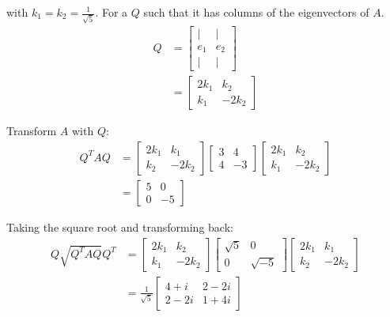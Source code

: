 \documentclass[11pt]{homework}
\begin{document}
with $k_1 = k_2 = \frac{1}{\sqrt{5}}$.
For a $Q$ such that it has columns 
of the eigenvectors of $A$.
\begin{align*}
Q &=
  \begin{bmatrix}
  | & |  \\
  e_1 & e_2 \\
  | & |
  \end{bmatrix} \\
  &=
  \begin{bmatrix}
  2 k_1 & k_2 \\
  k_1 & -2 k_2 
  \end{bmatrix}
\end{align*}

Transform $A$ with $Q$:
\begin{align*}
Q^T A Q &=
  \begin{bmatrix}
  2 k_1 & k_1 \\
  k_2 & -2 k_2
  \end{bmatrix}
  \begin{bmatrix}
  3 & 4 \\
  4 & -3 
  \end{bmatrix}
  \begin{bmatrix}
  2 k_1 & k_2 \\
  k_1 & -2 k_2 
  \end{bmatrix} \\
  &=
  \begin{bmatrix}
  5 & 0 \\
  0 & -5 
  \end{bmatrix}
\end{align*}

Taking the square root and transforming back:
\begin{align*}
Q \sqrt{Q^T A Q}Q^T &=
  \begin{bmatrix}
    2 k_1 & k_2 \\
    k_1 & -2 k_2 
  \end{bmatrix} 
  \begin{bmatrix}
    \sqrt{5} & 0 \\
    0 & \sqrt{-5}
  \end{bmatrix}
  \begin{bmatrix}
    2 k_1 & k_1 \\
    k_2 & -2 k_2
  \end{bmatrix} \\
  &=
  \frac{1}{\sqrt{5}}
  \begin{bmatrix}
    4+i  & 2-2i \\
    2-2i & 1+4i
  \end{bmatrix}
\end{align*}
\end{document}
